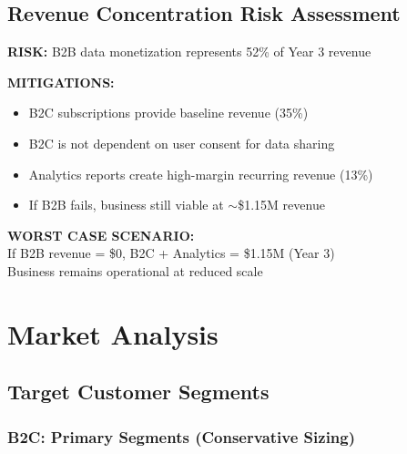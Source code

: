 \documentclass[11pt,a4paper]{article}
\begin{document}
\subsection{Revenue Concentration Risk Assessment}

\begin{riskbox}
\textbf{\textcolor{milored}{RISK:}} B2B data monetization represents 52\% of Year 3 revenue

\vspace{10pt}
\textbf{\textcolor{milogreen}{MITIGATIONS:}}
\begin{itemize}[leftmargin=15pt, itemsep=2pt]
    \item[\textcolor{milogreen}{\faIcon{check}}] B2C subscriptions provide baseline revenue (35\%)
    \item[\textcolor{milogreen}{\faIcon{check}}] B2C is not dependent on user consent for data sharing
    \item[\textcolor{milogreen}{\faIcon{check}}] Analytics reports create high-margin recurring revenue (13\%)
    \item[\textcolor{milogreen}{\faIcon{check}}] If B2B fails, business still viable at $\sim$\$1.15M revenue
\end{itemize}

\vspace{10pt}
\textbf{WORST CASE SCENARIO:}\\
If B2B revenue = \$0, B2C + Analytics = \$1.15M (Year 3)\\
Business remains operational at reduced scale
\end{riskbox}

\newpage

\section{Market Analysis}

\subsection{Target Customer Segments}

\subsubsection{B2C: Primary Segments (Conservative Sizing)}
\end{document}
